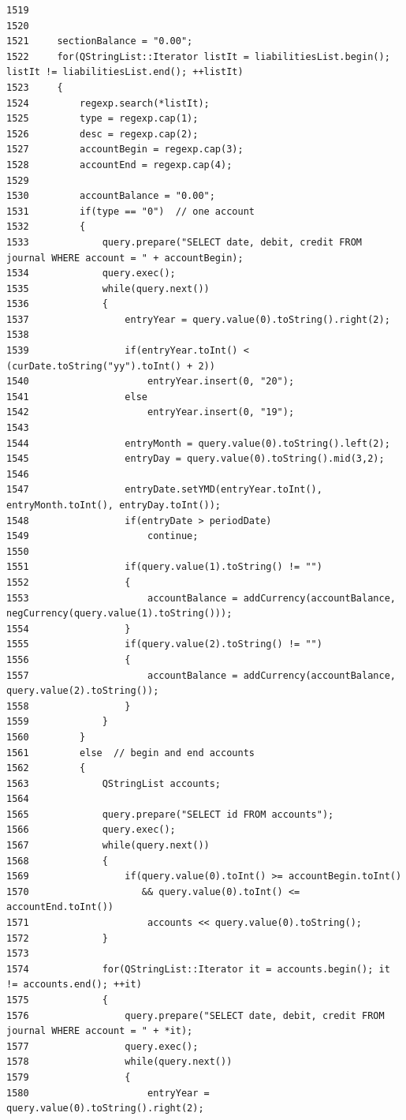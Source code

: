 \begin{verbatim}
1519 
1520 
1521     sectionBalance = "0.00";
1522     for(QStringList::Iterator listIt = liabilitiesList.begin(); listIt != liabilitiesList.end(); ++listIt)
1523     {
1524         regexp.search(*listIt);
1525         type = regexp.cap(1);
1526         desc = regexp.cap(2);
1527         accountBegin = regexp.cap(3);
1528         accountEnd = regexp.cap(4);
1529 
1530         accountBalance = "0.00";
1531         if(type == "0")  // one account
1532         {
1533             query.prepare("SELECT date, debit, credit FROM journal WHERE account = " + accountBegin);
1534             query.exec();
1535             while(query.next())
1536             {
1537                 entryYear = query.value(0).toString().right(2);
1538                 
1539                 if(entryYear.toInt() < (curDate.toString("yy").toInt() + 2))
1540                     entryYear.insert(0, "20");
1541                 else
1542                     entryYear.insert(0, "19");
1543                 
1544                 entryMonth = query.value(0).toString().left(2);
1545                 entryDay = query.value(0).toString().mid(3,2);
1546 
1547                 entryDate.setYMD(entryYear.toInt(), entryMonth.toInt(), entryDay.toInt());
1548                 if(entryDate > periodDate)
1549                     continue;
1550 
1551                 if(query.value(1).toString() != "")
1552                 {
1553                     accountBalance = addCurrency(accountBalance, negCurrency(query.value(1).toString()));
1554                 }
1555                 if(query.value(2).toString() != "")
1556                 {
1557                     accountBalance = addCurrency(accountBalance, query.value(2).toString());
1558                 }
1559             }
1560         }
1561         else  // begin and end accounts
1562         {
1563             QStringList accounts;
1564 
1565             query.prepare("SELECT id FROM accounts");
1566             query.exec();
1567             while(query.next())
1568             {
1569                 if(query.value(0).toInt() >= accountBegin.toInt()
1570                    && query.value(0).toInt() <= accountEnd.toInt())
1571                     accounts << query.value(0).toString();
1572             }
1573 
1574             for(QStringList::Iterator it = accounts.begin(); it != accounts.end(); ++it)
1575             {
1576                 query.prepare("SELECT date, debit, credit FROM journal WHERE account = " + *it);
1577                 query.exec();
1578                 while(query.next())
1579                 {
1580                     entryYear = query.value(0).toString().right(2);

\end{verbatim}
